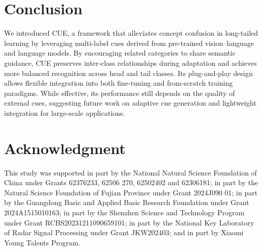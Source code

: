 \section{Conclusion}
\label{conclusion}
We introduced CUE, a framework that alleviates concept confusion in long-tailed learning by leveraging multi-label cues derived from pre-trained vision–language and language models. 
By encouraging related categories to share semantic guidance, CUE preserves inter-class relationships during adaptation and achieves more balanced recognition across head and tail classes. 
Its plug-and-play design allows flexible integration into both fine-tuning and from-scratch training paradigms. While effective, its performance still depends on the quality of external cues, suggesting future work on adaptive cue generation and lightweight integration for large-scale applications.


\sloppy
\section*{Acknowledgment}
This study was supported in part by the National Natural Science Foundation of China under Grants 62376233, 62506
270, 62502402 and 62306181; in part by the Natural Science Foundation of Fujian Province under Grant 2024J090
01; in part by the Guangdong Basic and Applied Basic Research Foundation under Grant 2024A1515010163; in part by the Shenzhen Science and Technology Program under Grant RCBS20231211090659101; in part by the National Key Laboratory of Radar Signal Processing under Grant JKW202403; and in part by Xiaomi Young Talents Program.
\fussy